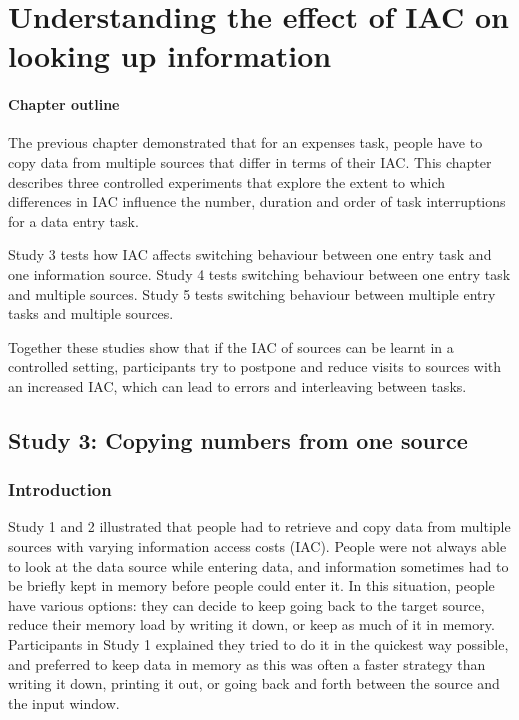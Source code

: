 \chapter{Understanding the effect of IAC on looking up information}

\begin{mynote}
\subsubsection{Chapter outline}
The previous chapter demonstrated that for an expenses task, people have to copy data from multiple sources that differ in terms of their IAC. This chapter describes three controlled experiments that explore the extent to which differences in IAC influence the number, duration and order of task interruptions for a data entry task. 

Study 3 tests how IAC affects switching behaviour between one entry task and one information source. Study 4 tests switching behaviour between one entry task and multiple sources. Study 5 tests switching behaviour between multiple entry tasks and multiple sources.

Together these studies show that if the IAC of sources can be learnt in a controlled setting, participants try to postpone and reduce visits to sources with an increased IAC, which can lead to errors and interleaving between tasks.

\end{mynote}

 
\section{Study 3: Copying numbers from one source}\label{ch:Study2}
\subsection{Introduction}
Study 1 and 2 illustrated that people had to retrieve and copy data from multiple sources with varying information access costs (IAC). People were not always able to look at the data source while entering data, and information sometimes had to be briefly kept in memory before people could enter it.
In this situation, people have various options: they can decide to keep going back to the target source, reduce their memory load by writing it down, or keep as much of it in memory. Participants in Study 1 explained they tried to do it in the quickest way possible, and preferred to keep data in memory as this was often a faster strategy than writing it down, printing it out, or going back and forth between the source and the input window.

